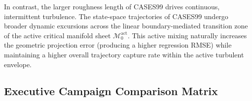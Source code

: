 \documentclass[11pt,letterpaper]{article}
\begin{document}
In contrast, the larger roughness length of CASES99 drives continuous, intermittent turbulence. The state-space trajectories of CASES99 undergo broader dynamic excursions across the linear boundary-mediated transition zone of the active critical manifold sheet $\mathcal{M}_0^{\text{act}}$. This active mixing naturally increases the geometric projection error (producing a higher regression RMSE) while maintaining a higher overall trajectory capture rate within the active turbulent envelope.

\subsection{Executive Campaign Comparison Matrix}
\label{subsec:executive_campaign_matrix}

\begin{table}[ht!]
\centering
\caption{Executive comparison of physical drivers, transition thresholds, and numerical behavior across campaigns.}
\label{tab:executive_campaign_matrix}
\small
{}
\end{table}
\end{document}
